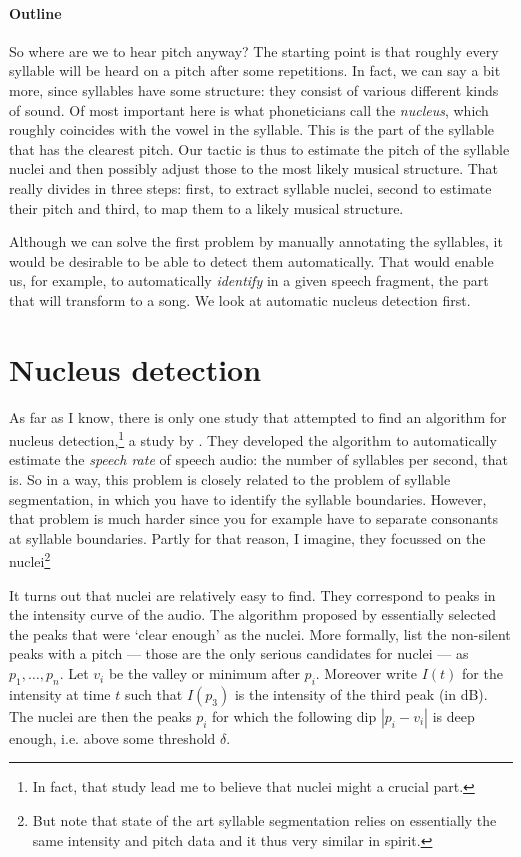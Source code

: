 \documentclass[a4paper,9pt]{article}
\begin{document}
\paragraph{Outline}
So where are we to hear pitch anyway? The starting point is that roughly every syllable will be heard on a pitch after some repetitions. In fact, we can say a bit more, since syllables have some structure: they consist of various different kinds of sound. Of most important here is what phoneticians call the \emph{nucleus}, which roughly coincides with the vowel in the syllable. This is the part of the syllable that has the clearest pitch. Our tactic is thus to estimate the pitch of the syllable nuclei and then possibly adjust those to the most likely musical structure. That really divides in three steps: first, to extract syllable nuclei, second to estimate their pitch and third, to map them to a likely musical structure.

Although we can solve the first problem by manually annotating the syllables, it would be desirable to be able to detect them automatically. That would enable us, for example, to automatically \emph{identify} in a given speech fragment, the part that will transform to a song. We look at automatic nucleus detection first.

\section{Nucleus detection}
As far as I know, there is only one study that attempted to find an algorithm for nucleus detection,\footnote{In fact, that study lead me to believe that nuclei might a crucial part.} a study by \citeauthor{DeJong2009a}. They developed the algorithm to automatically estimate the \emph{speech rate} of speech audio: the number of syllables per second, that is. So in a way, this problem is closely related to the problem of syllable segmentation, in which you have to identify the syllable boundaries. However, that problem is much harder since you for example have to separate consonants at syllable boundaries. Partly for that reason, I imagine, they focussed on the nuclei\footnote{But note that state of the art syllable segmentation relies on essentially the same intensity and pitch data and it thus very similar in spirit.}

It turns out that nuclei are relatively easy to find. They correspond to peaks in the intensity curve of the audio. The algorithm proposed by \citeauthor{DeJong2009a} essentially selected the peaks that were `clear enough' as the nuclei. More formally, list the non-silent peaks with a pitch --- those are the only serious candidates for nuclei --- as $p_1, \dots, p_n$. Let $v_i$ be the valley or minimum after $p_i$. Moreover write $I(t)$ for the intensity at time $t$ such that $I(p_3)$ is the intensity of the third peak (in dB). The nuclei are then the peaks $p_i$ for which the following dip $|p_i - v_i|$ is deep enough, i.e. above some threshold $\delta$.
\end{document}

